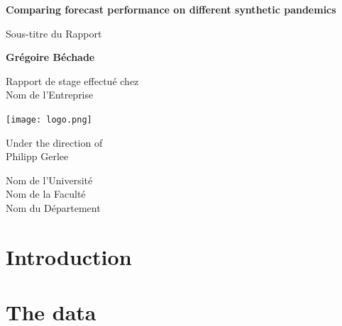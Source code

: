 \documentclass[12pt,a4paper]{report}
\begin{document}
\begin{titlepage}
    \begin{center}
        \vspace*{1cm}
        
        \Huge
        \textbf{Comparing forecast performance on different synthetic pandemics }
        
        \vspace{0.5cm}
        \LARGE
        Sous-titre du Rapport
        
        \vspace{1.5cm}
        
        \textbf{Grégoire Béchade}
        
        \vfill
        
        \Large
        Rapport de stage effectué chez \\
        Nom de l'Entreprise
        
        \vspace{0.8cm}
        
        \texttt{[image: logo.png]}
        
        \vfill
        
        \Large
        Under the direction of \\
        Philipp Gerlee
        
        \vspace{0.8cm}
        
        \Large
        Nom de l'Université \\
        Nom de la Faculté \\
        Nom du Département
        
    \end{center}
\end{titlepage}

\newpage
\thispagestyle{empty}
\mbox{}
\newpage

\tableofcontents
\newpage

\chapter*{Introduction}



\chapter{The data}
\end{document}
